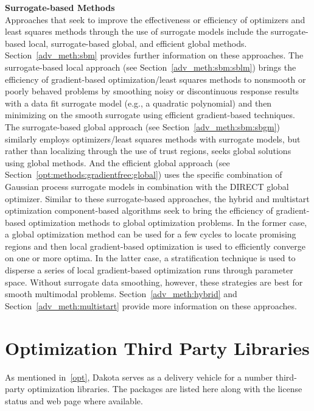 {\bf Surrogate-based Methods} \\ Approaches that seek to improve the
effectiveness or efficiency of optimizers and least squares methods
through the use of surrogate models include the surrogate-based local,
surrogate-based global, and efficient global
methods. Section~\ref{adv_meth:sbm} provides further information on
these approaches. The surrogate-based local approach (see
Section~\ref{adv_meth:sbm:sblm}) brings the efficiency of
gradient-based optimization/least squares methods to nonsmooth or
poorly behaved problems by smoothing noisy or discontinuous response
results with a data fit surrogate model (e.g., a quadratic polynomial)
and then minimizing on the smooth surrogate using efficient
gradient-based techniques. The surrogate-based global approach (see
Section~\ref{adv_meth:sbm:sbgm}) similarly employs optimizers/least
squares methods with surrogate models, but rather than localizing
through the use of trust regions, seeks global solutions using global
methods.  And the efficient global approach (see
Section~\ref{opt:methods:gradientfree:global}) uses the specific combination of
Gaussian process surrogate models in combination with the DIRECT
global optimizer. Similar to these surrogate-based approaches, the
hybrid and multistart optimization component-based algorithms seek to bring the
efficiency of gradient-based optimization methods to global
optimization problems. In the former case, a global optimization
method can be used for a few cycles to locate promising regions and
then local gradient-based optimization is used to efficiently converge
on one or more optima. In the latter case, a stratification technique
is used to disperse a series of local gradient-based optimization runs
through parameter space. Without surrogate data smoothing, however,
these strategies are best for smooth multimodal
problems. Section~\ref{adv_meth:hybrid} and
Section~\ref{adv_meth:multistart} provide more information on these
approaches.

\section{Optimization Third Party Libraries}
\label{opt:libraries}

As mentioned in~\ref{opt}, Dakota serves as a delivery vehicle for a
number third-party optimization libraries. The packages are listed
here along with the license status and web page where available.

